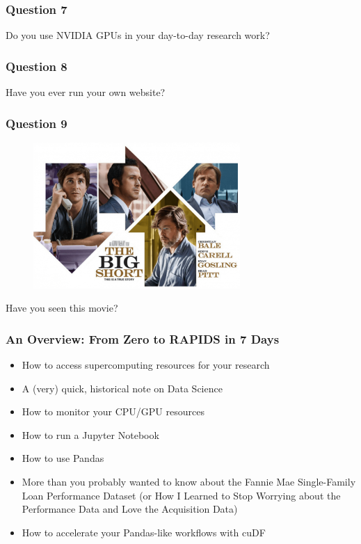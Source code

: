 \documentclass{beamer}
\begin{document}
\begin{frame}
   \frametitle{Question 7}
   \LARGE
   Do you use NVIDIA GPUs in your day-to-day research work?
\end{frame}

\begin{frame}
   \frametitle{Question 8}
   \LARGE
   Have you ever run your own website?
\end{frame}

\begin{frame}
   \frametitle{Question 9}
   \begin{figure}[htbp]
      \includegraphics[width=0.7\textwidth]{images/THE-BIG-SHORT-2-1200x849.png}
   \end{figure}
   \begin{center}\LARGE
      Have you seen this movie?
   \end{center}
\end{frame}

\begin{frame}
   \frametitle{An Overview: From Zero to RAPIDS in 7 Days}
   \begin{itemize}
      \setlength\itemsep{1.0em}
      \item How to access supercomputing resources for your research 
      \item A (very) quick, historical note on Data Science
      \item How to monitor your CPU/GPU resources
      \item How to run a Jupyter Notebook
      \item How to use Pandas
      \item More than you probably wanted to know about the Fannie Mae Single-Family Loan Performance Dataset (or How I Learned to Stop Worrying about the Performance Data and Love the Acquisition Data)
      \item How to accelerate your Pandas-like workflows with cuDF
   \end{itemize}   
\end{frame}
\end{document}
